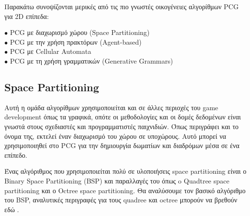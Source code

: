 Παρακάτω συνοψίζονται μερικές από τις πιο γνωστές οικογένειες αλγορίθμων PCG για 2D επίπεδα:

\begin{description}
  \item[$\bullet$ PCG με διαχωρισμό χώρου (Space Partitioning)] 
  \item[$\bullet$ PCG με την χρήση πρακτόρων (Agent-based)]
    \item[$\bullet$ PCG με Cellular Automata] 
    \item[$\bullet$ PCG με τη χρήση γραμματικών (Generative Grammars)] 
\end{description}

\subsection{Space Partitioning}
Αυτή η ομάδα αλγορίθμων χρησιμοποιείται και σε άλλες περιοχές του game development όπως τα γραφικά, οπότε οι μεθοδολογίες και οι δομές δεδομένων είναι γνωστά στους σχεδιαστές και προγραμματιστές παιχνιδιών. Όπως περιγράφει και το όνομα της, εκτελεί έναν διαχωρισμό του χώρου σε υποχώρους. Αυτό μπορεί να χρησιμοποιηθεί στο PCG για την δημιουργία δωματίων και διαδρόμων μέσα σε ένα  επίπεδο. \cite{pcgspacepart}
\par
Ένας αλγόριθμος που χρησιμοποιείται πολύ σε υλοποιήσεις space partitioning είναι ο Binary Space Partitioning (BSP) \cite{bsp} και παραλλαγές του όπως o Quadtree space partitioning και ο Octree space partitioning. Θα αναλύσουμε τον βασικό αλγόριθμο του BSP, αναλυτικές περιγραφές για τους quadree και octree μπορούν να βρεθούν εδώ \cite{octree}.

